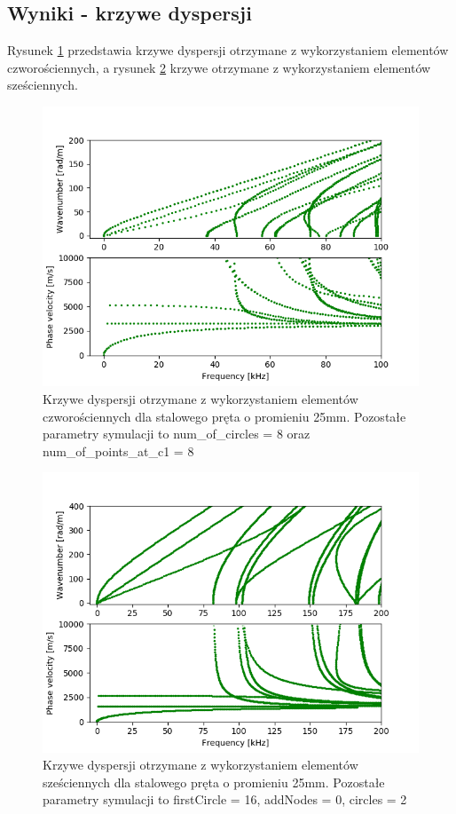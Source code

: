 \subsection{Wyniki - krzywe dyspersji}
\label{sec:53}

Rysunek \ref{fig:wykres4} przedstawia krzywe dyspersji otrzymane z wykorzystaniem elementów czworościennych, a rysunek \ref{fig:wykres8} krzywe otrzymane z wykorzystaniem elementów sześciennych.

\begin{figure}[h]
\centering
\includegraphics[width=14cm]{Zdjecia/5/wykres4}
\caption{Krzywe dyspersji otrzymane z wykorzystaniem elementów czworościennych dla stalowego pręta o promieniu 25mm.
Pozostałe parametry symulacji to num\_of\_circles = 8 oraz num\_of\_points\_at\_c1 = 8}
\label{fig:wykres4}
\end{figure}

\begin{figure}[h]
\centering
\includegraphics[width=14cm]{Zdjecia/5/wykres8}
\caption{Krzywe dyspersji otrzymane z wykorzystaniem elementów sześciennych dla stalowego pręta o promieniu 25mm.
Pozostałe parametry symulacji to firstCircle = 16, addNodes = 0, circles = 2}
\label{fig:wykres8}
\end{figure}


